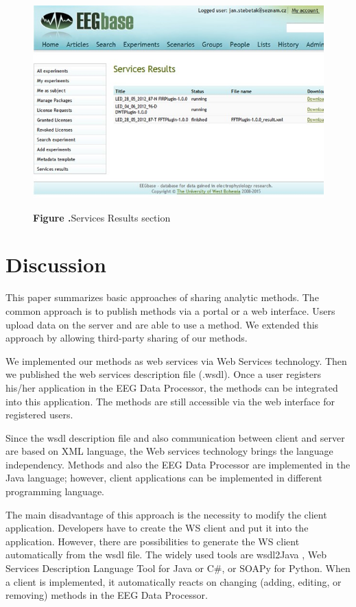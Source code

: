 \documentclass{frontiersSCNS} %
\begin{document}
\begin{figure}
\begin{center}
\includegraphics[width=16cm]{portal02}%
\end{center}
\textbf{\label{fig:05} Figure .}{Services Results section }
\end{figure}

\section{Discussion}

This paper summarizes basic approaches of sharing analytic methods. The common approach is to publish methods via a portal or a web interface. Users upload data on the server and are able to use a method. We extended this approach by allowing third-party sharing of our methods.

We implemented our methods as web services via Web Services technology. Then we published the web services description file (.wsdl). Once a user registers his/her application in the EEG Data Processor, the methods can be integrated into this application. The methods are still accessible via the web interface for registered users.

Since the wsdl description file and also communication between client and server are based on XML language, the Web services technology brings the language independency. Methods and also the EEG Data Processor are implemented in the Java language; however, client applications can be implemented in different programming language.

The main disadvantage of this approach is the necessity to modify the client application. Developers have to create the WS client and put it into the application. However, there are possibilities to generate the WS client automatically from the wsdl file. The widely used tools are wsdl2Java \cite{WSDL2Java}, Web Services Description Language Tool for Java or C\#, or SOAPy for Python. When a client is implemented, it automatically reacts on changing (adding, editing, or removing) methods in the EEG Data Processor.
\end{document}
